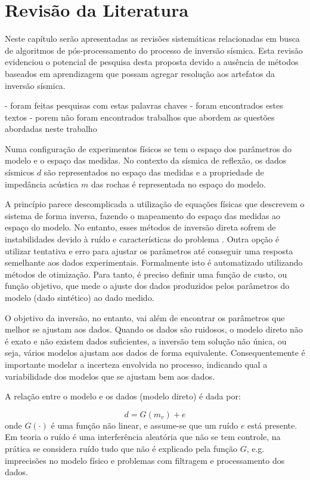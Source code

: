 \chapter{Revisão da Literatura}
\label{cap:2modelosSuperresolucao}

Neste capítulo serão apresentadas as revisões sistemáticas relacionadas
em busca de algoritmos de pós-processamento do processo de inversão sísmica.
Esta revisão evidenciou o potencial de pesquisa desta proposta devido a
ausência de métodos baseados em aprendizagem que possam agregar resolução
aos artefatos da inversão sísmica.

- foram feitas pesquisas com estas palavras chaves
- foram encontrados estes textos
- porem não foram encontrados trabalhos que abordem as questões abordadas neste trabalho



Numa configuração de experimentos físicos se tem o espaço dos parâmetros do
modelo e o espaço das medidas. No contexto da sísmica de reflexão, os dados
sísmicos $d$ são representados no espaço das medidas e a propriedade de
impedância acústica $m$ das rochas é representada no espaço do modelo.

A princípio parece descomplicada a utilização de equações físicas que descrevem
o sistema de forma inversa, fazendo o mapeamento do espaço das medidas ao espaço
do modelo. No entanto, esses métodos de inversão direta sofrem de instabilidades
devido à ruído e características do problema \citep[p. 50]{sen_livro}. Outra
opção é utilizar tentativa e erro para ajustar os parâmetros até conseguir uma
resposta semelhante aos dados experimentais. Formalmente isto é automatizado
utilizando métodos de otimização. Para tanto, é preciso definir uma função de
custo, ou função objetivo, que mede o ajuste dos dados produzidos pelos
parâmetros do modelo (dado sintético) ao dado medido.

O objetivo da inversão, no entanto, vai além de encontrar os parâmetros que
melhor se ajustam aos dados. Quando os dados são ruidosos, o modelo direto não é
exato e não existem dados suficientes, a inversão tem solução não única, ou
seja, vários modelos ajustam aos dados de forma equivalente. Consequentemente é
importante modelar a incerteza envolvida no processo, indicando qual a
variabilidade dos modelos que se ajustam bem aos dados.

A relação entre o modelo e os dados (modelo direto) é dada por:

\begin{equation}
d = G(m_v) + e
\end{equation}
onde $G(\cdot)$ é uma função não linear, e assume-se que um ruído $e$ está
presente. Em teoria o ruído é uma interferência aleatória que não se tem
controle, na prática se considera ruído tudo que não é explicado pela função
$G$, e.g. imprecisões no modelo físico e problemas com filtragem e processamento
dos dados.

